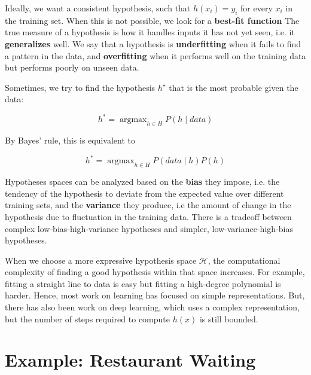 \documentclass{article}
\DeclareMathOperator*{\argmax}{argmax}
\begin{document}
Ideally, we want a consistent hypothesis, such that $h(x_i) = y_i$ for every
$x_i$ in the training set. When this is not possible, we look
for a \textbf{best-fit function} The true measure of a hypothesis is
how it handles inputs it has not yet seen, i.e. it \textbf{generalizes} well.
We say that a hypothesis is \textbf{underfitting} when it fails to find a pattern in
the data, and \textbf{overfitting} when it performs well on the training data but performs
poorly on unseen data.

Sometimes, we try to find the hypothesis $h^\star$ that is the most
probable given the data:

\[ h^* = \argmax_{h \in H} P(h \mid data) \]

By Bayes' rule, this is equivalent to

\[ h^* = \argmax_{h \in H} P(data \mid h) P(h) \]

Hypotheses spaces can be analyzed based on the \textbf{bias} they impose, i.e. the tendency
of the hypothesis to deviate from the expected value over different training sets, and
the \textbf{variance} they produce, i.e the amount of change in the hypothesis due to fluctuation
in the training data. There is a tradeoff between complex low-bias-high-variance hypotheses
and simpler, low-variance-high-bias hypotheses.

When we choose a more expressive hypothesis space $\mathcal H$, the computational
complexity of finding a good hypothesis within that space increases. For example,
fitting a straight line to data is easy but fitting a high-degree polynomial is harder.
Hence, most work on learning has focused on simple representations. But, there has also been
work on deep learning, which uses a complex representation, but the number of steps
required to compute $h(x)$ is still bounded.

\section{Example: Restaurant Waiting}
\end{document}

